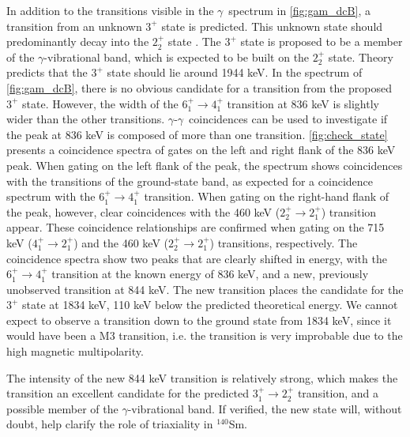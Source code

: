 \documentclass[twoside,english]{uiofysmaster/uiofysmaster}
\newcommand{\Sm}{$^{140}$Sm} %
\newcommand{\ga}{$\gamma$}
\let\orgautoref\autoref
\renewcommand{\autoref}
        {%
		 \def\sectionautorefname{Section}%
		 \def\subsectionautorefname{Section}%
		 \def\subsubsectionautorefname{Section}%
		 \def\chapterautorefname{Chapter}%
          \orgautoref}
\begin{document}
In addition to the transitions visible in the \ga\ spectrum in \autoref{fig:gam_dcB}, a transition from an unknown $3^+$ state is predicted.
This unknown state should predominantly decay into the $2_2^+$ state \cite{Klintefjord2016, Samorajczyk2015}.
The $3^+$ state is proposed to be a member of the \ga-vibrational band, which is expected to be built on the $2_2^+$ state.
Theory predicts that the $3^+$ state should lie around 1944 keV.
In the spectrum of \autoref{fig:gam_dcB}, there is no obvious candidate for a transition from the proposed $3^+$ state.
However, the width of the $6_1^+ \rightarrow 4_1^+$ transition at 836 keV is slightly wider than the other transitions. 
\ga-\ga\ coincidences can be used to investigate if the peak at 836 keV is composed of more than one transition. 
\autoref{fig:check_state} presents a coincidence spectra of gates on the left and right flank of the 836 keV peak.
When gating on the left flank of the peak, the spectrum shows coincidences with the transitions of the ground-state band, as expected for a coincidence spectrum with the $6_1^+ \rightarrow 4_1^+$ transition. 
When gating on the right-hand flank of the peak, however, clear coincidences with the 460 keV ($2_2^+ \rightarrow 2_1^+$) transition appear. 
These coincidence relationships are confirmed when gating on the 715 keV ($4_1^+ \rightarrow 2_1^+$) and the 460 keV ($2_2^+ \rightarrow 2_1^+$) transitions, respectively. 
The coincidence spectra show two peaks that are clearly shifted in energy, with the $6_1^+ \rightarrow 4_1^+$ transition at the known energy of 836 keV, and a new, previously unobserved transition at 844 keV. 
The new transition places the candidate for the $3^+$ state at 1834 keV, 110 keV below the predicted theoretical energy. 
We cannot expect to observe a transition down to the ground state from 1834 keV, since it would have been a M3 transition, i.e. the transition is very improbable due to the high magnetic multipolarity.

The intensity of the new 844 keV transition is relatively strong, which makes the transition an excellent candidate for the predicted $3_1^+ \rightarrow 2_2^+$ transition, and a possible member of the \ga-vibrational band. If verified, the new state will, without doubt, help clarify the role of triaxiality in \Sm.
\end{document}
